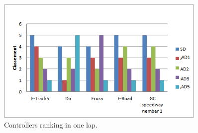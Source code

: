 \documentclass{llncs}
\begin{document}
\begin{figure}[h!]
	
	\centering
	\includegraphics[width=0.9\textwidth]{fig/classement.PNG}
	\begin{minipage}{10cm}
		\centering
		\caption{\footnotesize Controllers ranking in one lap.}
		\label{clas}
	\end{minipage} 

\end{figure}
\end{document}
